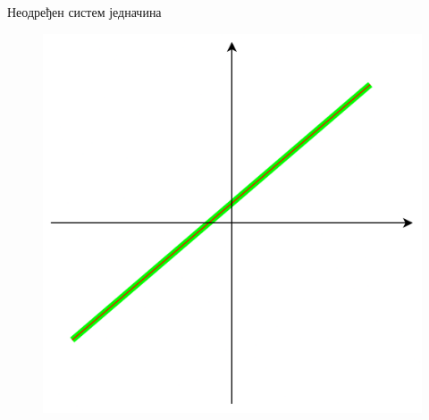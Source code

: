 \documentclass[xcolor=table]{beamer}
\begin{document}
    \begin{frame}{Неодређен систем једначина}
        \begin{figure}
            \centering
            \includegraphics[width=\textwidth,height=0.8\textheight,keepaspectratio]{images/neodredjen_jed.png}
        \end{figure}
    \end{frame}
    
\end{document}
